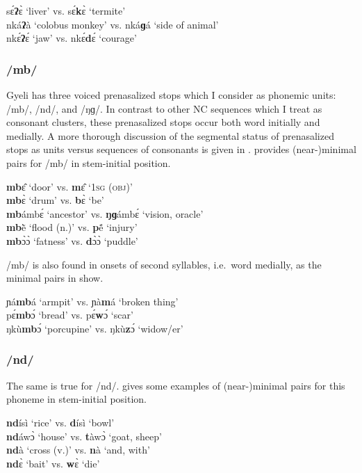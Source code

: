 \ea \label{?}
sɛ́{\bfseries ʔ}ɛ̀ `liver' vs. sɛ́{\bfseries k}ɛ̀ `termite' \\
nká{\bfseries ʔ}à `colobus monkey' vs. nká{\bfseries ɡ}á `side of animal' \\
nkɛ́{\bfseries ʔ}ɛ́ `jaw' vs. nkɛ́{\bfseries d}ɛ́ `courage'
\z






\subsubsection*{\bfseries /mb/} Gyeli has three voiced prenasalized stops which I consider as phonemic units: /mb/, /nd/, and /ŋɡ/. In contrast to other NC sequences which I treat as consonant clusters, these prenasalized stops occur both word initially and medially. A more thorough discussion of the segmental status of prenasalized stops as units versus sequences of consonants is given in .  provides (near-)minimal pairs for /mb/ in stem-initial position.

\ea \label{mb}
{\bfseries mb}ɛ̂ `door' vs. {\bfseries m}ɛ̂ `1\textsc{sg} (\textsc{obj})' \\
{\bfseries mb}ɛ̀ `drum' vs. {\bfseries b}ɛ̀  `be' \\
{\bfseries mb}ámbɛ́ `ancestor' vs. {\bfseries ŋɡ}ámbɛ́ `vision, oracle' \\
{\bfseries mb}ẽ̀ `flood (n.)' vs. {\bfseries p}ẽ́ `injury' \\
{\bfseries mb}ɔ̀ɔ̀ `fatness' vs. {\bfseries d}ɔ̀ɔ̀ `puddle' 
\z

\noindent /mb/ is also found in onsets of second syllables, i.e.\ word medially, as the minimal pairs in  show.

\ea \label{mbm}
ɲá{\bfseries mb}á `armpit' vs. ɲà{\bfseries m}á `broken thing' \\
pɛ́{\bfseries mb}ɔ́ `bread' vs. pɛ́{\bfseries w}ɔ́ `scar' \\
ŋkù{\bfseries mb}ɔ́ `porcupine' vs. ŋkù{\bfseries z}ɔ́ `widow/er' 
\z


\subsubsection*{\bfseries /nd/} The same is true for /nd/.  gives some examples of (near-)minimal pairs for this phoneme in stem-initial position.


\ea \label{nd}
{\bfseries nd}ísì `rice' vs. {\bfseries d}ísì `bowl' \\
{\bfseries nd}áwɔ̀ `house' vs. {\bfseries t}àwɔ̀ `goat, sheep' \\
{\bfseries nd}à `cross (v.)' vs. {\bfseries n}à `and, with' \\
{\bfseries nd}ɛ̀ `bait' vs. {\bfseries w}ɛ̀ `die' 
\z

